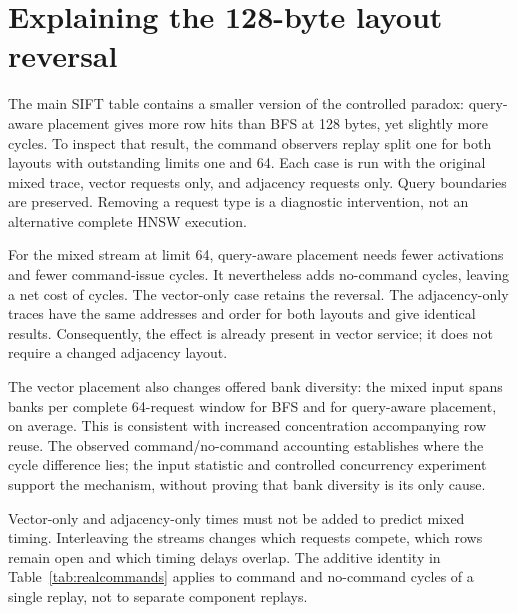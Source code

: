 \section{Explaining the 128-byte layout reversal}
The main SIFT table contains a smaller version of the controlled paradox: query-aware placement gives more row hits than BFS at 128 bytes, yet slightly more cycles. To inspect that result, the command observers replay split one for both layouts with outstanding limits one and 64. Each case is run with the original mixed trace, vector requests only, and adjacency requests only. Query boundaries are preserved. Removing a request type is a diagnostic intervention, not an alternative complete HNSW execution.

\begin{table}[htbp]\centering\small
\caption[Command accounting for the layout reversal]{Query-aware minus BFS for the 128-byte diagnostic streams on split one. Negative counts mean fewer cycles or commands. The last two columns sum exactly to the cycle difference. Limit is the outstanding-read bound.}\label{tab:realcommands}

\end{table}

For the mixed stream at limit 64, query-aware placement needs \MixedSavedACT{} fewer activations and \MixedSavedCommands{} fewer command-issue cycles. It nevertheless adds \MixedExtraNoCommand{} no-command cycles, leaving a net cost of \MixedDeltaCycles{} cycles. The vector-only case retains the reversal. The adjacency-only traces have the same addresses and order for both layouts and give identical results. Consequently, the effect is already present in vector service; it does not require a changed adjacency layout.

The vector placement also changes offered bank diversity: the mixed input spans \BfsOfferedBanks{} banks per complete 64-request window for BFS and \QAOfferedBanks{} for query-aware placement, on average. This is consistent with increased concentration accompanying row reuse. The observed command/no-command accounting establishes where the cycle difference lies; the input statistic and controlled concurrency experiment support the mechanism, without proving that bank diversity is its only cause.

Vector-only and adjacency-only times must not be added to predict mixed timing. Interleaving the streams changes which requests compete, which rows remain open and which timing delays overlap. The additive identity in Table~\ref{tab:realcommands} applies to command and no-command cycles of a single replay, not to separate component replays.

